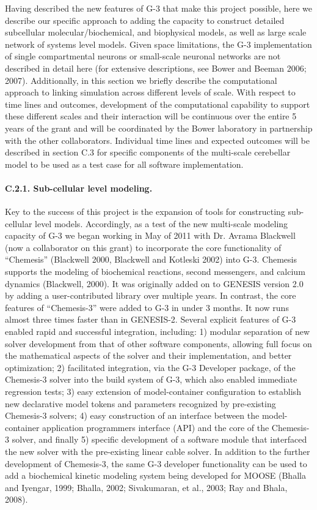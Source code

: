 \documentclass[12pt]{article}
\begin{document}
\noindent Having described the new features of G-3 that make this
project possible, here we describe our specific
approach to adding the capacity to construct detailed subcellular
molecular/biochemical, and biophysical models, as well as large scale
network of systems level models. Given
space limitations, the G-3 implementation of
single compartmental neurons or small-scale neuronal networks are not described in detail here (for extensive descriptions, see Bower and Beeman 2006; 2007). Additionally, in this section
we briefly describe the computational approach to linking simulation across
different levels of scale.  With respect to time lines and outcomes,
development of the computational capability to support these different scales 
and their interaction will be continuous over the
entire 5 years of the grant and will be coordinated by the Bower
laboratory in partnership with the other collaborators. Individual
time lines and expected outcomes will be described in section C.3 for
specific components of the multi-scale cerebellar model to be
used as a test case for all software implementation.

\paragraph{C.2.1. Sub-cellular level modeling.} Key to the success of this project is the expansion of tools for constructing sub-cellular level models. Accordingly, as a test of the new multi-scale modeling capacity of G-3 we began working in May of 2011 with Dr. Avrama Blackwell (now a collaborator on this grant) to incorporate the core functionality of ``Chemesis'' (Blackwell 2000, Blackwell and Kotleski 2002) into G-3. Chemesis supports the modeling of biochemical reactions, second messengers, and calcium dynamics (Blackwell, 2000). It was originally added on to GENESIS version 2.0 by adding a user-contributed library over multiple years. In contrast, the core features of ``Chemesis-3'' were added to G-3 in under 3 months. It now runs almost three times faster than in GENESIS-2. Several explicit features of G-3 enabled rapid and successful integration, including: 1) modular separation of new solver development from that of other software components, allowing full focus on the mathematical aspects of the solver and their implementation, and better optimization; 2) facilitated integration, via the G-3 Developer package, of the Chemesis-3 solver into the build system of G-3, which also enabled immediate regression tests; 3) easy extension of model-container configuration to establish new declarative model tokens and parameters recognized by pre-existing Chemesis-3 solvers; 4) easy construction of an interface between the model-container application programmers interface (API) and the core of the Chemesis-3 solver, and finally 5) specific development of a software module that interfaced the new solver with the pre-existing linear cable solver. In addition to the further development of Chemesis-3, the same G-3 developer functionality can be used to add a biochemical kinetic modeling system being developed for MOOSE (Bhalla and Iyengar, 1999; Bhalla, 2002; Sivakumaran, et al., 2003; Ray and Bhala, 2008).
\end{document}
